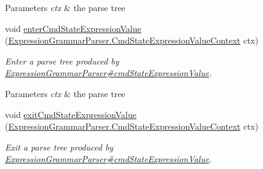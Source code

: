 \begin{DoxyCompactItemize}
\begin{DoxyCompactList}
\begin{DoxyParams}{Parameters}
{\em ctx} & the parse tree\\
\hline
\end{DoxyParams}
 \end{DoxyCompactList}\item 
void \hyperlink{classgov_1_1nasa_1_1jpf_1_1inspector_1_1server_1_1expression_1_1parser_1_1_expression_grammar_base_listener_a8ff05a447dfc6f675d72d2018d013409}{enter\+Cmd\+State\+Expression\+Value} (\hyperlink{classgov_1_1nasa_1_1jpf_1_1inspector_1_1server_1_1expression_1_1parser_1_1_expression_grammar_pa17ff9e538e96e94398ba5af02b5ffa30}{Expression\+Grammar\+Parser.\+Cmd\+State\+Expression\+Value\+Context} ctx)
\begin{DoxyCompactList}\small\item\em Enter a parse tree produced by \hyperlink{classgov_1_1nasa_1_1jpf_1_1inspector_1_1server_1_1expression_1_1parser_1_1_expression_grammar_parser_a9c38888905b31e514c2e4a695b8b2be6}{Expression\+Grammar\+Parser\#cmd\+State\+Expression\+Value}.


\begin{DoxyParams}{Parameters}
{\em ctx} & the parse tree\\
\hline
\end{DoxyParams}
 \end{DoxyCompactList}\item 
void \hyperlink{classgov_1_1nasa_1_1jpf_1_1inspector_1_1server_1_1expression_1_1parser_1_1_expression_grammar_base_listener_a23523103e94665acf8d8e83f37e0b637}{exit\+Cmd\+State\+Expression\+Value} (\hyperlink{classgov_1_1nasa_1_1jpf_1_1inspector_1_1server_1_1expression_1_1parser_1_1_expression_grammar_pa17ff9e538e96e94398ba5af02b5ffa30}{Expression\+Grammar\+Parser.\+Cmd\+State\+Expression\+Value\+Context} ctx)
\begin{DoxyCompactList}\small\item\em Exit a parse tree produced by \hyperlink{classgov_1_1nasa_1_1jpf_1_1inspector_1_1server_1_1expression_1_1parser_1_1_expression_grammar_parser_a9c38888905b31e514c2e4a695b8b2be6}{Expression\+Grammar\+Parser\#cmd\+State\+Expression\+Value}.



\end{DoxyCompactList}
\end{DoxyCompactItemize}
